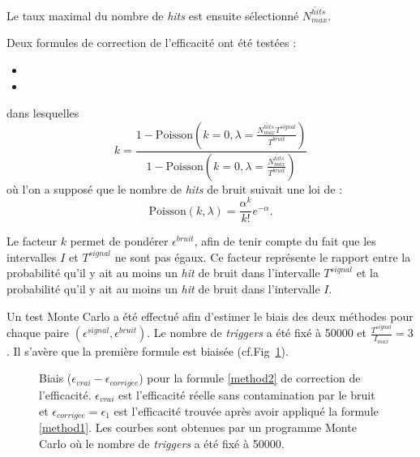 Le taux maximal du nombre de \textit{hits} est ensuite sélectionné $\overline{N^{hits}_{max}}$.

\newpage
Deux formules de correction de l'efficacité ont été testées :
\begin{itemize}[label=$\bullet$]
	\vspace{0.3cm}
	\item {}
	\vspace{0.3cm}
	\item {}
\end{itemize}
dans lesquelles 
\begin{equation}
k=\frac{1-\mbox{Poisson}\left(k=0,\lambda=\frac{\overline{N^{hits}_{max}}T^{signal}}{T^{bruit}}\right)}{1-\mbox{Poisson}\left(k=0,\lambda=\frac{\overline{N^{hits}_{max}}}{T^{bruit}}\right)}
\end{equation}
où l'on a supposé que le nombre de \textit{hits} de bruit suivait une loi de  :
\begin{equation}
\mbox{Poisson}\left(k,\lambda\right)=\frac{\alpha^k}{k!}e^{-\alpha}. 
\end{equation} 

Le facteur $k$ permet de pondérer $\epsilon^{bruit}$, afin de tenir compte du fait que les intervalles $I$ et $T^{signal}$ ne sont pas égaux. Ce facteur représente le rapport entre la probabilité qu'il y ait au moins un \textit{hit} de bruit dans l'intervalle $T^{signal}$ et la probabilité qu'il y ait au moins un \textit{hit} de bruit dans l'intervalle $I$.

Un test Monte Carlo a été effectué afin d'estimer le biais des deux méthodes pour chaque paire $\left(\epsilon^{signal},\epsilon^{bruit}\right)$. Le nombre de \textit{triggers} a été fixé à \num{50000} et $\frac{T^{signal}}{I_{max}}=3$. Il s'avère que la première formule est biaisée (cf.Fig~\ref{biaismethod1}).

\tikzexternaldisable
\begin{figure}[!ht]
\centering
{}
\caption{Biais ($\epsilon_{vrai} -\epsilon_{corrig\acute ee}$) pour la formule \ref{method2} de correction de l'efficacité. $\epsilon_{vrai}$ est l'efficacité réelle sans contamination par le bruit et $\epsilon_{corrig\acute ee}=\epsilon_{1}$ est l'efficacité trouvée après avoir appliqué la formule \ref{method1}. Les courbes sont obtenues par un programme Monte Carlo où le nombre de \textit{triggers} a été fixé à \num{50000}.}
\label{biaismethod1}
\end{figure}

